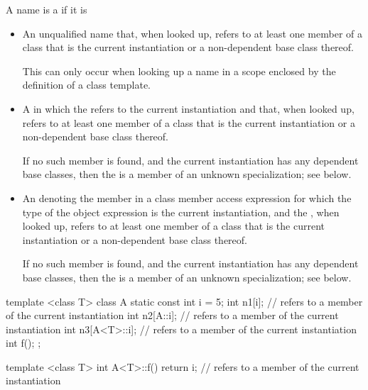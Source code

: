 \pnum
{}%
A name is a
if it is

\begin{itemize}
\item
An unqualified name that, when looked up, refers to
at least one member of a class that is
the current instantiation or a non-dependent base class thereof.
\begin{note}
This can only occur when looking up a name in a scope enclosed by the
definition of a class template.
\end{note}
\item
A
in which the
refers to the current instantiation
and that, when looked up, refers to at least one member of a class that is
the current
instantiation or a non-dependent base class thereof.
\begin{note}
If no such
member is found, and the current instantiation has any dependent base classes,
then the  is a member of an unknown specialization;
see below.
\end{note}

\item
An  denoting the member in a class member access
expression for which the type of the object expression is the
current instantiation, and the , when looked
up, refers to at least one member of a class
that is the current
instantiation or a non-dependent base class thereof.
\begin{note}
If no such
member is found, and the current instantiation has any dependent base classes,
then the  is a member of an unknown specialization;
see below.
\end{note}
\end{itemize}

\begin{example}
\begin{codeblock}
template <class T> class A {
  static const int i = 5;
  int n1[i];                    //  refers to a member of the current instantiation
  int n2[A::i];                 //  refers to a member of the current instantiation
  int n3[A<T>::i];              //  refers to a member of the current instantiation
  int f();
};

template <class T> int A<T>::f() {
  return i;                     //  refers to a member of the current instantiation
}
\end{codeblock}
\end{example}

